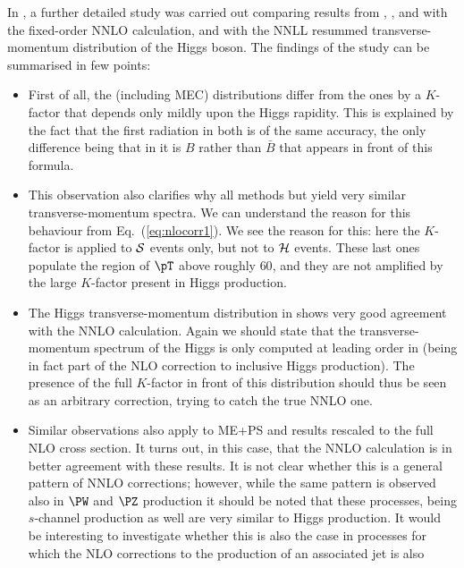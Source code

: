 In , a further detailed study was carried out 
comparing results from \pythia{}, \POWHEG{}, and \MCatNLO{} with the fixed-order 
NNLO calculation, and with the NNLL resummed transverse-momentum
distribution of the Higgs boson.  
The findings of the study can be summarised in few points: 
\begin{itemize}
\item First of all, the \pythia{} (including MEC)
      distributions differ from the \POWHEG{} 
      ones by a $K$-factor that depends only mildly upon the Higgs rapidity. 
      This is explained by the fact that the first radiation in both
      is of the same accuracy, the only difference being that in \pythia{} 
      it is $B$ rather than $\bar{B}$ that appears in front of this formula.
\item This observation also clarifies why all methods but \MCatNLO{} yield 
      very similar transverse-momentum spectra.  We can understand the reason
      for this behaviour from Eq.~(\ref{eq:nlocorr1}).
      We see the reason for this: here the $K$-factor is applied to ${\cal S}$
      events only, but not to ${\cal H}$ events. These last ones populate 
      the region of $\pT$ above roughly $60$\UGeV, and 
      they are not amplified by the large $K$-factor present in Higgs 
      production.
\item The Higgs transverse-momentum distribution in \POWHEG{} shows
      very good agreement with the NNLO calculation. Again we should state 
      that the transverse-momentum spectrum of the Higgs is only computed
      at leading order in \POWHEG{} (being in fact part of the NLO correction
      to inclusive Higgs production). The presence of the full $K$-factor 
      in front of this distribution should thus be seen as an arbitrary 
      correction, trying to catch the true NNLO one. 
\item Similar observations also apply to ME+PS and \pythia{} results rescaled 
      to the full NLO cross section. It turns out, in this case, that the 
      NNLO calculation is in better agreement with these results.  It is 
      not clear whether this is a general pattern of NNLO corrections; however,
      while the same pattern is observed also in $\PW$ and $\PZ$ production
      it should be noted that these processes, being $s$-channel production
      as well are very similar to Higgs production. It would be interesting 
      to investigate whether this is also the case in processes for which 
      the NLO corrections to the production of an associated jet is also 

\end{itemize}
